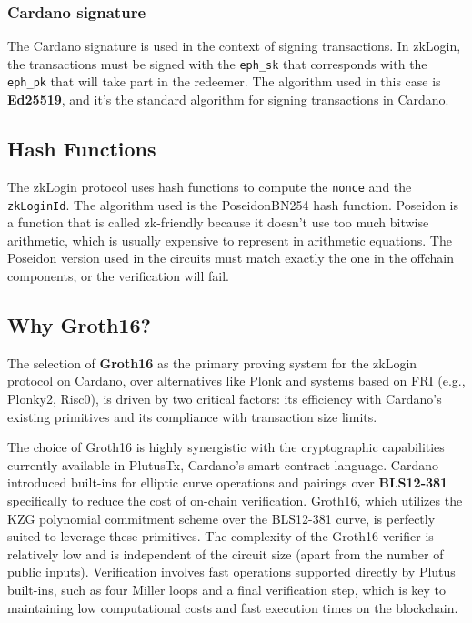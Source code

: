 \documentclass{article}
\begin{document}
\subsubsection{Cardano signature}
The Cardano signature is used in the context of signing transactions.
In zkLogin, the transactions must be signed with the \texttt{eph\_sk} that corresponds with the \texttt{eph\_pk} that will take part in the redeemer.
The algorithm used in this case is \textbf{Ed25519}, and it's the standard algorithm for signing transactions in Cardano.

\subsection{Hash Functions}
The zkLogin protocol uses hash functions to compute the \texttt{nonce} and the \texttt{zkLoginId}.
The algorithm used is the PoseidonBN254 hash function.
Poseidon is a function that is called zk-friendly because it doesn't use too much bitwise arithmetic, which is usually expensive to represent in arithmetic equations. The Poseidon version used in the circuits must match exactly the one in the offchain components, or the verification will fail.

\subsection{Why Groth16?}
The selection of \textbf{Groth16} as the primary proving system for the zkLogin protocol on Cardano, over alternatives like Plonk and systems based on FRI (e.g., Plonky2, Risc0), is driven by two critical factors: its efficiency with Cardano's existing primitives and its compliance with transaction size limits.

The choice of Groth16 is highly synergistic with the cryptographic capabilities currently available in PlutusTx, Cardano's smart contract language. Cardano introduced built-ins for elliptic curve operations and pairings over \textbf{BLS12-381} specifically to reduce the cost of on-chain verification. Groth16, which utilizes the KZG polynomial commitment scheme over the BLS12-381 curve, is perfectly suited to leverage these primitives. The complexity of the Groth16 verifier is relatively low and is independent of the circuit size (apart from the number of public inputs). Verification involves fast operations supported directly by Plutus built-ins, such as four Miller loops and a final verification step, which is key to maintaining low computational costs and fast execution times on the blockchain.
\end{document}
